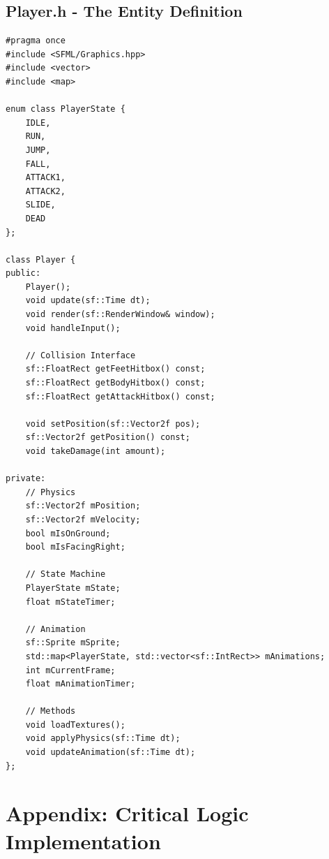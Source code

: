 \documentclass[10pt, a4paper]{article}
\begin{document}
\newpage

\subsection{Player.h - The Entity Definition}
\begin{lstlisting}[caption={Header file for the Player class}]
#pragma once
#include <SFML/Graphics.hpp>
#include <vector>
#include <map>

enum class PlayerState {
    IDLE,
    RUN,
    JUMP,
    FALL,
    ATTACK1,
    ATTACK2,
    SLIDE,
    DEAD
};

class Player {
public:
    Player();
    void update(sf::Time dt);
    void render(sf::RenderWindow& window);
    void handleInput();
    
    // Collision Interface
    sf::FloatRect getFeetHitbox() const;
    sf::FloatRect getBodyHitbox() const;
    sf::FloatRect getAttackHitbox() const;
    
    void setPosition(sf::Vector2f pos);
    sf::Vector2f getPosition() const;
    void takeDamage(int amount);

private:
    // Physics
    sf::Vector2f mPosition;
    sf::Vector2f mVelocity;
    bool mIsOnGround;
    bool mIsFacingRight;
    
    // State Machine
    PlayerState mState;
    float mStateTimer;
    
    // Animation
    sf::Sprite mSprite;
    std::map<PlayerState, std::vector<sf::IntRect>> mAnimations;
    int mCurrentFrame;
    float mAnimationTimer;
    
    // Methods
    void loadTextures();
    void applyPhysics(sf::Time dt);
    void updateAnimation(sf::Time dt);
};
\end{lstlisting}

\newpage

\section{Appendix: Critical Logic Implementation}
\end{document}
